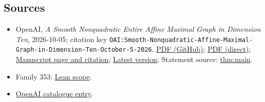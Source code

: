 \documentclass[11pt]{article}
\begin{document}
\subsection{Sources}
\begin{itemize}
\item OpenAI, \emph{A Smooth Nonquadratic Entire Affine Maximal Graph in Dimension Ten}, 2026-10-05; citation key \texttt{OAI:Smooth-Nonquadratic-Affine-Maximal-Graph-in-Dimension-Ten-October-5-2026}. \href{https://github.com/openai/math/blob/adc7f1241b42e322a6451854ab7e4b4c146bf78a/preprints/Smooth-Nonquadratic-Affine-Maximal-Graph-in-Dimension-Ten-October-5-2026/affine-maximal-dimension-ten.pdf}{PDF (GitHub)}; \href{https://github.com/openai/math/raw/adc7f1241b42e322a6451854ab7e4b4c146bf78a/preprints/Smooth-Nonquadratic-Affine-Maximal-Graph-in-Dimension-Ten-October-5-2026/affine-maximal-dimension-ten.pdf}{PDF (direct)}; \href{https://github.com/openai/math/blob/adc7f1241b42e322a6451854ab7e4b4c146bf78a/preprints/Smooth-Nonquadratic-Affine-Maximal-Graph-in-Dimension-Ten-October-5-2026/README.md}{Manuscript page and citation}; \href{https://github.com/openai/math/blob/main/preprints/Smooth-Nonquadratic-Affine-Maximal-Graph-in-Dimension-Ten-October-5-2026/affine-maximal-dimension-ten.pdf}{Latest version}; Statement source: \href{https://github.com/openai/math/blob/adc7f1241b42e322a6451854ab7e4b4c146bf78a/preprints/Smooth-Nonquadratic-Affine-Maximal-Graph-in-Dimension-Ten-October-5-2026/build/source/main.tex\#L53}{thm:main}.
\item Family 353: \href{https://github.com/openai/math/blob/adc7f1241b42e322a6451854ab7e4b4c146bf78a/lean/docs/353.md}{Lean scope}.
\item \href{https://github.com/openai/math/blob/adc7f1241b42e322a6451854ab7e4b4c146bf78a/CONTENTS.md}{OpenAI catalogue entry}.
\end{itemize}
\end{document}

